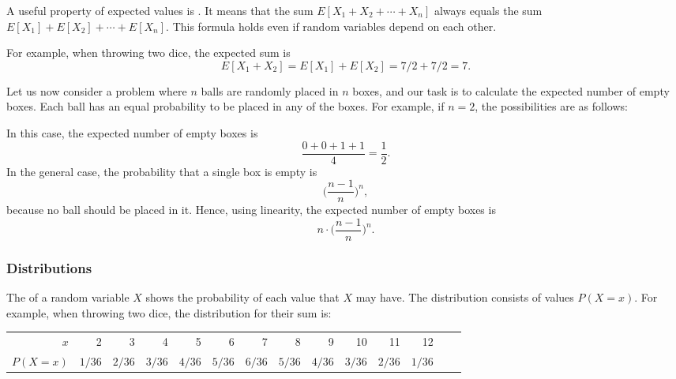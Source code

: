 A useful property of expected values is .
It means that the sum
$E[X_1+X_2+\cdots+X_n]$
always equals the sum
$E[X_1]+E[X_2]+\cdots+E[X_n]$.
This formula holds even if random variables
depend on each other.

For example, when throwing two dice,
the expected sum is
\[E[X_1+X_2]=E[X_1]+E[X_2]=7/2+7/2=7.\]

Let us now consider a problem where
$n$ balls are randomly placed in $n$ boxes,
and our task is to calculate the expected
number of empty boxes.
Each ball has an equal probability to
be placed in any of the boxes.
For example, if $n=2$, the possibilities
are as follows:
\begin{center}
\end{center}
In this case, the expected number of
empty boxes is
\[\frac{0+0+1+1}{4} = \frac{1}{2}.\]
In the general case, the probability that a
single box is empty is
\[\Big(\frac{n-1}{n}\Big)^n,\]
because no ball should be placed in it.
Hence, using linearity, the expected number of
empty boxes is
\[n \cdot \Big(\frac{n-1}{n}\Big)^n.\]

\subsubsection{Distributions}


The  of a random variable $X$
shows the probability of each value that
$X$ may have.
The distribution consists of values $P(X=x)$.
For example, when throwing two dice,
the distribution for their sum is:
\begin{center}
\small {
\begin{tabular}{r|rrrrrrrrrrrrr}
$x$ & 2 & 3 & 4 & 5 & 6 & 7 & 8 & 9 & 10 & 11 & 12 \\
$P(X=x)$ & $1/36$ & $2/36$ & $3/36$ & $4/36$ & $5/36$ & $6/36$ & $5/36$ & $4/36$ & $3/36$ & $2/36$ & $1/36$ \\
\end{tabular}
}
\end{center}

